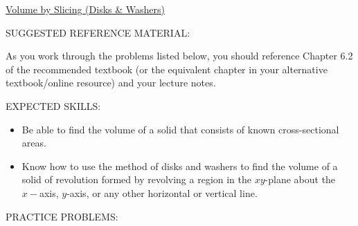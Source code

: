 \documentclass[12pt]{article}
\begin{document}
\begin{center}
\underline{\LARGE{Volume by Slicing (Disks \& Washers)}}
\end{center}

\bigskip

\noindent SUGGESTED REFERENCE MATERIAL:

\bigskip

\noindent As you work through the problems listed below, you should reference Chapter 6.2 of the recommended textbook (or the equivalent chapter in your alternative textbook/online resource) and your lecture notes.

\bigskip

\noindent EXPECTED SKILLS:

\begin{itemize}

\item Be able to find the volume of a solid that consists of known cross-sectional areas. 

\item Know how to use the method of disks and washers to find the volume of a solid of revolution formed by revolving a region in the $xy$-plane about the $x-$axis, $y$-axis, or any other horizontal or vertical line.

\end{itemize}

\noindent PRACTICE PROBLEMS:

\medskip
\end{document}
